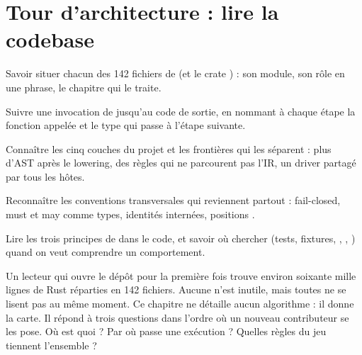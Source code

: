\chapter{Tour d'architecture : lire la codebase}
\label{chap:tour-architecture}

\begin{objectifs}
  \item Savoir situer chacun des 142 fichiers de  (et le crate ) : son module, son rôle en une phrase, le chapitre qui le traite.
  \item Suivre une invocation  de  jusqu'au code de sortie, en nommant à chaque étape la fonction appelée et le type qui passe à l'étape suivante.
  \item Connaître les cinq couches du projet et les frontières qui les séparent : plus d'AST après le lowering, des règles qui ne parcourent pas l'IR, un driver partagé par tous les hôtes.
  \item Reconnaître les conventions transversales qui reviennent partout : fail-closed, must et may comme types, identités internées, positions .
  \item Lire les trois principes de  dans le code, et savoir où chercher (tests, fixtures, , , ) quand on veut comprendre un comportement.
\end{objectifs}


Un lecteur qui ouvre le dépôt pour la première fois trouve environ soixante mille lignes de Rust réparties en 142 fichiers. Aucune n'est inutile, mais toutes ne se lisent pas au même moment. Ce chapitre ne détaille aucun algorithme : il donne la carte. Il répond à trois questions dans l'ordre où un nouveau contributeur se les pose. Où est quoi ? Par où passe une exécution ? Quelles règles du jeu tiennent l'ensemble ?


